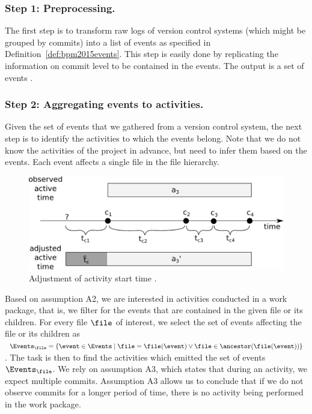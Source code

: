 \subsubsection*{Step 1: Preprocessing.} The first step is to transform raw logs of version control systems (which might be grouped by commits) into a list of events as specified in Definition~\ref{def:bpm2015events}. This step is easily done by replicating the information on commit level to be contained in the events. The output is a set of events \Events.

\subsubsection*{Step 2: Aggregating events to activities.}
Given the set of events \Events that we gathered from a version control system, the next step is to identify the activities to which the events belong. Note that we do not know the activities of the project in advance, but need to infer them based on the events. Each event affects a single file in the file hierarchy.

\begin{figure}
\centering
\includegraphics[width=.7\textwidth]{bpm2015/imgs/activity_adjustment}
\caption{Adjustment of activity start time \startTimeFunction. }
\label{fig:activity_adjustment}
\end{figure}

Based on assumption A2, we are interested in activities conducted in a work package, that is, we filter for the events that are contained in the given file or its children. For every file $\file$ of interest, we select the set of events affecting the file or its children as $\Events_{\file} = \lbrace \event \in \Events \mid \file = \file(\event) \vee \file \in \ancestor(\file(\event))  \rbrace$. The task is then to find the activities which emitted the set of events $\Events_{\file}$. We rely on assumption A3, which states that during an activity, we expect multiple commits. Assumption A3 allows us to conclude that if we do not observe commits for a longer period of time, there is no activity being performed in the work package.

